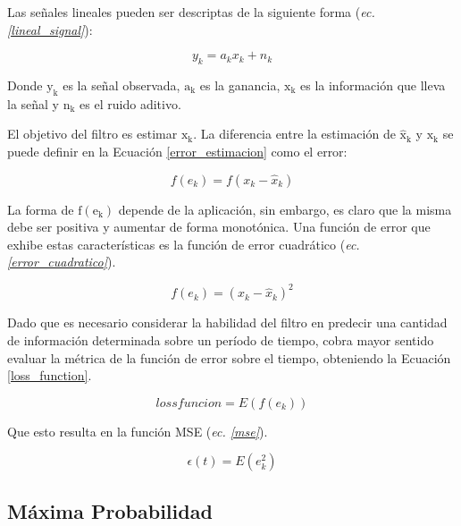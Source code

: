 \documentclass[10pt,a4paper]{article}
\begin{document}
\noindent Las señales lineales pueden ser descriptas de la siguiente forma
(\emph{ec.\ref{lineal_signal}}):

\begin{equation}
    y_k = a_k x_k + n_k \label{lineal_signal}
\end{equation}

\noindent Donde $\mathrm{y_k}$ es la señal observada, $\mathrm{a_k}$ es la 
ganancia, $\mathrm{x_k}$ es la informaci\'on que lleva la señal y $\mathrm{n_k}$ 
es el ruido aditivo.

\noindent El objetivo del filtro es estimar $\mathrm{x_k}$. La diferencia entre
la estimaci\'on de $\mathrm{\hat{x}_k}$ y $\mathrm{x_k}$ se puede definir en la
Ecuaci\'on \ref{error_estimacion} como el error:

\begin{equation}
    f(e_k) = f(x_k - \hat{x}_k) \label{error_estimacion}
\end{equation}

La forma de $\mathrm{f(e_k)}$ depende de la aplicaci\'on, sin embargo, es claro
que la misma debe ser positiva y aumentar de forma monot\'onica. Una funci\'on
de error que exhibe estas caracter\'isticas es la funci\'on de error
cuadr\'atico (\emph{ec. \ref{error_cuadratico}}).

\begin{equation}
    f(e_k) = (x_k - \hat{x}_k)^2 \label{error_cuadratico}
\end{equation}

Dado que es necesario considerar la habilidad del filtro en predecir una
cantidad de informaci\'on determinada sobre un per\'iodo de tiempo, cobra mayor
sentido evaluar la m\'etrica de la funci\'on de error sobre el tiempo,
obteniendo la Ecuaci\'on \ref{loss_function}.

\begin{equation}
    lossfuncion = E\left(f(e_k)\right) \label{loss_function}
\end{equation}

Que esto resulta en la funci\'on \acrshort{MSE} (\emph{ec. \ref{mse}}).

\begin{equation}
    \epsilon(t) = E(e^2_k) \label{mse}
\end{equation}

\subsection{M\'axima Probabilidad}\label{maximum_likelihood_section}
\end{document}
